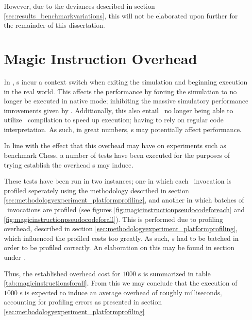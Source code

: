 However, due to the deviances described in section \ref{sec:results_benchmarkvariations}, this will not be elaborated upon further for the remainder of this dissertation.




\section{Magic Instruction Overhead}
\label{sec:results_magicinstructionoverhead}
In \dvttermsimics , \dvttermmagicinstruction s incur a context switch when exiting the simulation and beginning execution in the real world.
This affects the performance by forcing the simulation to no longer be executed in native mode; inhibiting the massive simulatory performance imrovements given by \dvttermhostvirtualizationextensions .
Additionally, this also entail \dvttermsimics\ no longer being able to utilize \dvttermjit\ compilation to speed up execution; having to rely on regular code interpretation.
As such, in great numbers, \dvttermmagicinstruction s may potentially affect performance. 

In line with the effect that this overhead may have on experiments such as benchmark Chess, a number of tests have been executed for the purposes of trying establish the overhead \dvttermmagicinstruction s may induce.

These tests have been run in two instances; one in which each \dvttermmagicinstruction\ invocation is profiled seperately using the methodology described in section \ref{sec:methodologyexperiment_platformprofiling}, and another in which batches of \dvttermmagicinstruction\ invocations are profiled (see figures \ref{fig:magicinstructionpseudocodeforeach} and \ref{fig:magicinstructionpseudocodeforall}).
This is performed due to profiling overhead, described in section \ref{sec:methodologyexperiment_platformprofiling}, which influenced the profiled costs too greatly.
As such, \dvttermmagicinstruction s had to be batched in order to be profiled correctly.
An elaboration on this may be found in section  under .



Thus, the established overhead cost for $1000$ \dvttermmagicinstruction s is summarized in table \ref{tab:magicinstructionsforall}.
From this we may conclude that the execution of $1000$ \dvttermmagicinstruction s is expected to induce an average overhead of roughly  milliseconds, accounting for profiling errors as presented in section \ref{sec:methodologyexperiment_platformprofiling}

